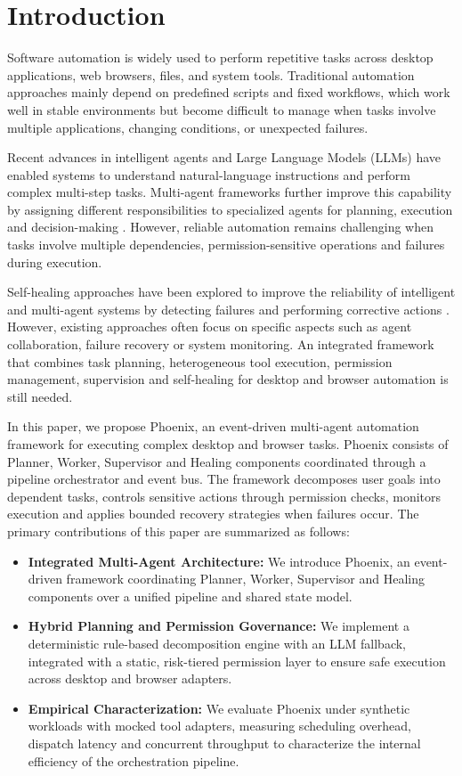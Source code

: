 \documentclass[conference]{IEEEtran}
\begin{document}
\section{Introduction}
Software automation is widely used to perform repetitive tasks across desktop applications, web browsers, files, and system tools. Traditional automation approaches mainly depend on predefined scripts and fixed workflows, which work well in stable environments but become difficult to manage when tasks involve multiple applications, changing conditions, or unexpected failures.

Recent advances in intelligent agents and Large Language Models (LLMs) have enabled systems to understand natural-language instructions and perform complex multi-step tasks. Multi-agent frameworks further improve this capability by assigning different responsibilities to specialized agents for planning, execution and decision-making \cite{guo2026, patel2026isiber, bajoria2026}. However, reliable automation remains challenging when tasks involve multiple dependencies, permission-sensitive operations and failures during execution.

Self-healing approaches have been explored to improve the reliability of intelligent and multi-agent systems by detecting failures and performing corrective actions \cite{jeong2026, bara2026, patel2026isiber}. However, existing approaches often focus on specific aspects such as agent collaboration, failure recovery or system monitoring. An integrated framework that combines task planning, heterogeneous tool execution, permission management, supervision and self-healing for desktop and browser automation is still needed.

In this paper, we propose Phoenix, an event-driven multi-agent automation framework for executing complex desktop and browser tasks. Phoenix consists of Planner, Worker, Supervisor and Healing components coordinated through a pipeline orchestrator and event bus. The framework decomposes user goals into dependent tasks, controls sensitive actions through permission checks, monitors execution and applies bounded recovery strategies when failures occur. The primary contributions of this paper are summarized as follows:
\begin{itemize}
    \item \textbf{Integrated Multi-Agent Architecture:} We introduce Phoenix, an event-driven framework coordinating Planner, Worker, Supervisor and Healing components over a unified pipeline and shared state model.
    \item \textbf{Hybrid Planning and Permission Governance:} We implement a deterministic rule-based decomposition engine with an LLM fallback, integrated with a static, risk-tiered permission layer to ensure safe execution across desktop and browser adapters.
    \item \textbf{Empirical Characterization:} We evaluate Phoenix under synthetic workloads with mocked tool adapters, measuring scheduling overhead, dispatch latency and concurrent throughput to characterize the internal efficiency of the orchestration pipeline.
\end{itemize}
\end{document}
